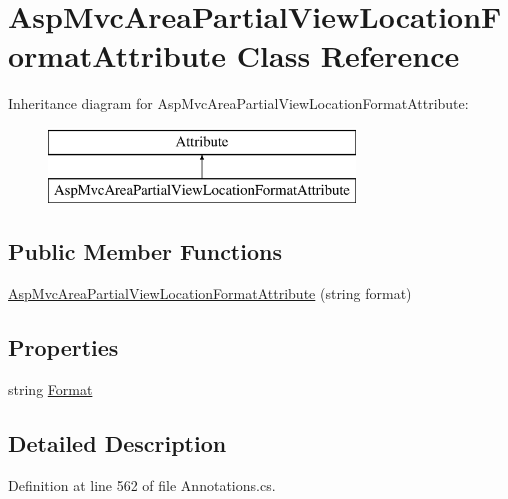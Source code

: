 \hypertarget{class_asp_mvc_area_partial_view_location_format_attribute}{}\section{Asp\+Mvc\+Area\+Partial\+View\+Location\+Format\+Attribute Class Reference}
\label{class_asp_mvc_area_partial_view_location_format_attribute}
Inheritance diagram for Asp\+Mvc\+Area\+Partial\+View\+Location\+Format\+Attribute\+:\begin{figure}[H]
\begin{center}
\leavevmode
\includegraphics[height=2.000000cm]{class_asp_mvc_area_partial_view_location_format_attribute}
\end{center}
\end{figure}
\subsection*{Public Member Functions}
\begin{DoxyCompactItemize}
\item 
\hyperlink{class_asp_mvc_area_partial_view_location_format_attribute_a2cceb11c102f6ddf218094062d74b161}{Asp\+Mvc\+Area\+Partial\+View\+Location\+Format\+Attribute} (string format)
\end{DoxyCompactItemize}
\subsection*{Properties}
\begin{DoxyCompactItemize}
\item 
string \hyperlink{class_asp_mvc_area_partial_view_location_format_attribute_a9de8c471614445bbbcbf2051209ec446}{Format}
\end{DoxyCompactItemize}


\subsection{Detailed Description}


Definition at line 562 of file Annotations.\+cs.



